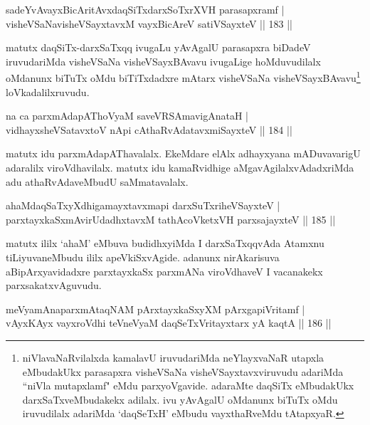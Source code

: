 
\begin{shl}
sadeYvAvayxBicAritAvxdaqSiTxdarxSoTxrXVH parasapxramf |\\
visheVSaNavisheVSayxtavxM vayxBicAreV satiVSayxteV \hfill || 183 ||
\end{shl}

\begin{artha}
matutx daqSiTx-darxSaTxqq ivugaLu yAvAgalU parasapxra biDadeV iruvudariMda visheVSaNa visheVSayxBAvavu ivugaLige hoMduvudilalx oMdanunx biTuTx oMdu biTiTxdadxre mAtarx visheVSaNa visheVSayxBAvavu\footnote{niVlavaNaRvilalxda kamalavU iruvudariMda neYlayxvaNaR utapxla eMbudakUkx parasapxra visheVSaNa visheVSayxtavxviruvudu adariMda ``niVla mutapxlamf" eMdu parxyoVgavide. adaraMte daqSiTx eMbudakUkx darxSaTxveMbudakekx adilalx. ivu yAvAgalU oMdanunx biTuTx oMdu iruvudilalx adariMda `daqSeTxH' eMbudu vayxthaRveMdu tAtapxyaR.} loVkadalilxruvudu.
\end{artha}

\begin{shl}
na ca parxmAdapAThoV\s yaM saveVRSAmavigAnataH |\\
vidhayxsheVSatavxtoV nApi cAthaRvAdatavxmiSayxteV \hfill || 184 ||
\end{shl}	

\begin{artha}
matutx idu parxmAdapAThavalalx. EkeMdare elAlx adhayxyana mADuvavarigU adaralilx viroVdhavilalx. matutx idu kamaRvidhige aMgavAgilalxvAdadxriMda adu athaRvAdaveMbudU saMmatavalalx.
\end{artha}


\begin{shl}
ahaMdaqSaTxyXdhigamayxtavxmapi darxSuTxriheVSayxteV |\\
parxtayxkaSxmAvirUdadhxtavxM tathAcoVketxVH parxsajayxteV \hfill || 185 ||
\end{shl}

\begin{artha}
matutx ililx `ahaM' eMbuva budidhxyiMda I darxSaTxqqvAda Atamxnu tiLiyuvaneMbudu ililx apeVkiSxvAgide. adanunx nirAkarisuva aBipArxyavidadxre parxtayxkaSx parxmANa viroVdhaveV I vacanakekx parxsakatxvAguvudu.
\end{artha}

\begin{shl}
meVyamAnaparxmAtaqNAM pArxtayxkaSxyXM pArxgapiVritamf |\\
vAyxKAyx vayxroVdhi teVneVyaM daqSeTxVritayxtarx yA kaqtA \hfill || 186 ||
\end{shl}

